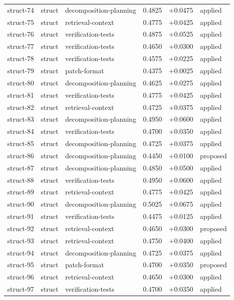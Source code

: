 \begin{center}
\begin{longtable}{llp{5.2cm}rrl}
struct-74 & struct & decomposition-planning & 0.4825 & +0.0475 & applied \\
struct-75 & struct & retrieval-context & 0.4775 & +0.0425 & applied \\
struct-76 & struct & verification-tests & 0.4875 & +0.0525 & applied \\
struct-77 & struct & verification-tests & 0.4650 & +0.0300 & applied \\
struct-78 & struct & verification-tests & 0.4575 & +0.0225 & applied \\
struct-79 & struct & patch-format & 0.4375 & +0.0025 & applied \\
struct-80 & struct & decomposition-planning & 0.4625 & +0.0275 & applied \\
struct-81 & struct & verification-tests & 0.4775 & +0.0425 & applied \\
struct-82 & struct & retrieval-context & 0.4725 & +0.0375 & applied \\
struct-83 & struct & decomposition-planning & 0.4950 & +0.0600 & applied \\
struct-84 & struct & verification-tests & 0.4700 & +0.0350 & applied \\
struct-85 & struct & decomposition-planning & 0.4725 & +0.0375 & applied \\
struct-86 & struct & decomposition-planning & 0.4450 & +0.0100 & proposed \\
struct-87 & struct & decomposition-planning & 0.4850 & +0.0500 & applied \\
struct-88 & struct & verification-tests & 0.4950 & +0.0600 & applied \\
struct-89 & struct & retrieval-context & 0.4775 & +0.0425 & applied \\
struct-90 & struct & decomposition-planning & 0.5025 & +0.0675 & applied \\
struct-91 & struct & verification-tests & 0.4475 & +0.0125 & applied \\
struct-92 & struct & retrieval-context & 0.4650 & +0.0300 & proposed \\
struct-93 & struct & retrieval-context & 0.4750 & +0.0400 & applied \\
struct-94 & struct & decomposition-planning & 0.4725 & +0.0375 & applied \\
struct-95 & struct & patch-format & 0.4700 & +0.0350 & proposed \\
struct-96 & struct & retrieval-context & 0.4650 & +0.0300 & applied \\
struct-97 & struct & verification-tests & 0.4700 & +0.0350 & applied \\

\end{longtable}
\end{center}
